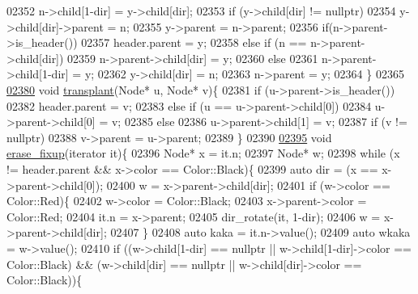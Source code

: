 \begin{DoxyCode}
02352         n->child[1-dir] = y->child[dir];
02353         \textcolor{keywordflow}{if} (y->child[dir] != \textcolor{keyword}{nullptr})
02354             y->child[dir]->parent = n;
02355         y->parent = n->parent;
02356         \textcolor{keywordflow}{if}(n->parent->is\_header())
02357             header.parent = y;
02358         \textcolor{keywordflow}{else} if (n == n->parent->child[dir])
02359             n->parent->child[dir] = y;
02360         \textcolor{keywordflow}{else}
02361             n->parent->child[1-dir] = y;
02362         y->child[dir] = n;
02363         n->parent = y;
02364     \}
02365 
\hyperlink{classaed2_1_1map_a98b9f200c64ce02dfb67902ee00e375a_a98b9f200c64ce02dfb67902ee00e375a}{02380}     \textcolor{keywordtype}{void} \hyperlink{classaed2_1_1map_a98b9f200c64ce02dfb67902ee00e375a_a98b9f200c64ce02dfb67902ee00e375a}{transplant}(Node* u, Node* v)\{
02381         \textcolor{keywordflow}{if} (u->parent->is\_header())
02382             header.parent = v;
02383         \textcolor{keywordflow}{else} if (u == u->parent->child[0])
02384             u->parent->child[0] = v;
02385         \textcolor{keywordflow}{else}
02386             u->parent->child[1] = v;
02387         \textcolor{keywordflow}{if} (v != \textcolor{keyword}{nullptr})
02388             v->parent = u->parent;
02389     \}
02390 
\hyperlink{classaed2_1_1map_a7870c8f26e82b00d0aeb2e9f331dfec6_a7870c8f26e82b00d0aeb2e9f331dfec6}{02395}     \textcolor{keywordtype}{void} \hyperlink{classaed2_1_1map_a7870c8f26e82b00d0aeb2e9f331dfec6_a7870c8f26e82b00d0aeb2e9f331dfec6}{erase\_fixup}(iterator it)\{
02396         Node* x = it.n;
02397         Node* w;
02398         \textcolor{keywordflow}{while} (x != header.parent && x->color == Color::Black)\{
02399             \textcolor{keyword}{auto} dir = (x == x->parent->child[0]);
02400             w = x->parent->child[dir];
02401             \textcolor{keywordflow}{if} (w->color == Color::Red)\{
02402                 w->color = Color::Black;
02403                 x->parent->color = Color::Red;
02404                 it.n = x->parent;
02405                 dir\_rotate(it, 1-dir);
02406                 w = x->parent->child[dir];
02407             \}
02408             \textcolor{keyword}{auto} kaka = it.n->value();
02409             \textcolor{keyword}{auto} wkaka = w->value();
02410             \textcolor{keywordflow}{if} ((w->child[1-dir] == \textcolor{keyword}{nullptr} || w->child[1-dir]->color == Color::Black) && (w->child[dir] ==
       \textcolor{keyword}{nullptr} || w->child[dir]->color == Color::Black))\{

\end{DoxyCode}
